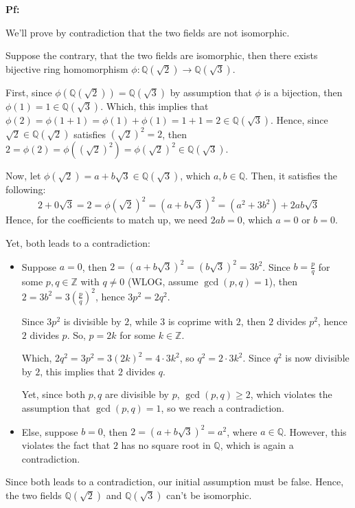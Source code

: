 \documentclass{article}
\begin{document}
\textbf{Pf:}

We'll prove by contradiction that the two fields are not isomorphic.

Suppose the contrary, that the two fields are isomorphic, then there exists bijective ring homomorphism $\phi:\mathbb{Q}(\sqrt{2})\rightarrow\mathbb{Q}(\sqrt{3})$.

First, since $\phi(\mathbb{Q}(\sqrt{2}))= \mathbb{Q}(\sqrt{3})$ by assumption that $\phi$ is a bijection, then $\phi(1)=1\in\mathbb{Q}(\sqrt{3})$.
Which, this implies that $\phi(2)=\phi(1+1)=\phi(1)+\phi(1)=1+1=2\in\mathbb{Q}(\sqrt{3})$. Hence, since $\sqrt{2}\in\mathbb{Q}(\sqrt{2})$ satisfies $(\sqrt{2})^2=2$,
then $2=\phi(2)=\phi((\sqrt{2})^2)=\phi(\sqrt{2})^2\in\mathbb{Q}(\sqrt{3})$.

Now, let $\phi(\sqrt{2})=a+b\sqrt{3}\in\mathbb{Q}(\sqrt{3})$, which $a,b\in\mathbb{Q}$. Then, it satisfies the following:
$$2+0\sqrt{3}=2=\phi(\sqrt{2})^2=(a+b\sqrt{3})^2=(a^2+3b^2)+2ab\sqrt{3}$$
Hence, for the coefficients to match up, we need $2ab = 0$, which $a=0$ or $b=0$.

Yet, both leads to a contradiction:
\begin{itemize}
    \item Suppose $a=0$, then $2=(a+b\sqrt{3})^2=(b\sqrt{3})^2=3b^2$. Since $b=\frac{p}{q}$ for some $p,q\in\mathbb{Z}$ with $q\neq 0$ (WLOG, assume $\gcd(p,q)=1$),
    then $2=3b^2=3(\frac{p}{q})^2$, hence $3p^2=2q^2$.
    
    Since $3p^2$ is divisible by $2$, while $3$ is coprime with $2$, then $2$ divides $p^2$, hence $2$ divides $p$. So, $p=2k$ for some $k\in\mathbb{Z}$.

    Which, $2q^2=3p^2=3(2k)^2=4\cdot 3k^2$, so $q^2=2\cdot 3k^2$. Since $q^2$ is now divisible by $2$, this implies that $2$ divides $q$.

    Yet, since both $p,q$ are divisible by $p$, $\gcd(p,q)\geq 2$, which violates the assumption that $\gcd(p,q)=1$, so we reach a contradiction.

    \hfil

    \item Else, suppose $b=0$, then $2=(a+b\sqrt{3})^2=a^2$, where $a\in\mathbb{Q}$. However, this violates the fact that $2$ has no square root in $\mathbb{Q}$, which is again a contradiction.
\end{itemize}

Since both leads to a contradiction, our initial assumption must be false. Hence, the two fields $\mathbb{Q}(\sqrt{2})$ and $\mathbb{Q}(\sqrt{3})$ can't be isomorphic.
\end{document}
